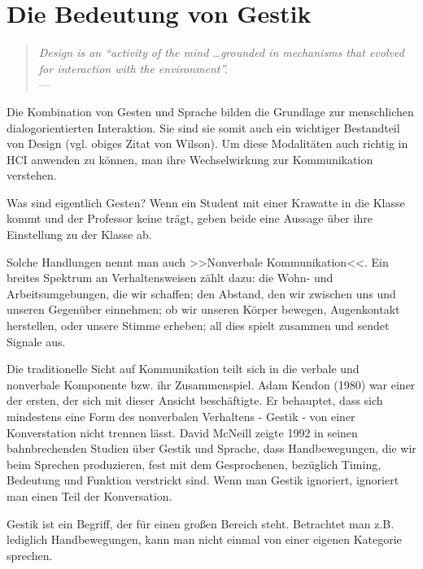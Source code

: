 \section{Die Bedeutung von Gestik}\label{sec:Gestik}

\begin{quote}
	\begin{flushright}{\slshape    
	    Design is an “activity of the mind \ldots grounded in mechanisms that evolved for interaction with the environment”.} \\ \medskip
	    ---  \citep{Wilson:2002}
	\end{flushright}
\end{quote}

Die Kombination von Gesten und Sprache bilden die Grundlage zur menschlichen dialogorientierten Interaktion. Sie sind sie somit auch ein wichtiger Bestandteil von Design (vgl. obiges Zitat von Wilson). Um diese Modalitäten auch richtig in \ac{HCI} anwenden zu können, man ihre Wechselwirkung zur Kommunikation verstehen.

\medskip Was sind eigentlich Gesten? Wenn ein Student mit einer Krawatte in die Klasse kommt und der Professor keine trägt, geben beide eine Aussage über ihre Einstellung zu der Klasse ab. 

Solche Handlungen nennt man auch >>Nonverbale Kommunikation<<. Ein breites Spektrum an Verhaltensweisen zählt dazu: die Wohn- und Arbeitsumgebungen, die wir schaffen; den Abstand, den wir zwischen uns und unseren Gegenüber einnehmen; ob wir unseren Körper bewegen, Augenkontakt herstellen, oder unsere Stimme erheben; all dies spielt zusammen und sendet Signale aus.

Die traditionelle Sicht auf Kommunikation teilt sich in die verbale und nonverbale Komponente bzw. ihr Zusammenspiel. Adam Kendon (1980) war einer der ersten, der sich mit dieser Ansicht beschäftigte. Er behauptet, dass sich mindestens eine Form des nonverbalen Verhaltens - Gestik - von einer Konverstation nicht trennen lässt. David McNeill zeigte 1992 in seinen bahnbrechenden Studien über Gestik und Sprache, dass Handbewegungen, die wir beim Sprechen produzieren, fest mit dem Gesprochenen, bezüglich Timing, Bedeutung und Funktion verstrickt sind. Wenn man Gestik ignoriert, ignoriert man einen Teil der Konversation.

\medskip Gestik ist ein Begriff, der für einen großen Bereich steht. Betrachtet man z.B. lediglich Handbewegungen, kann man nicht einmal von einer eigenen Kategorie sprechen. \citep{Goldin:2003} 

